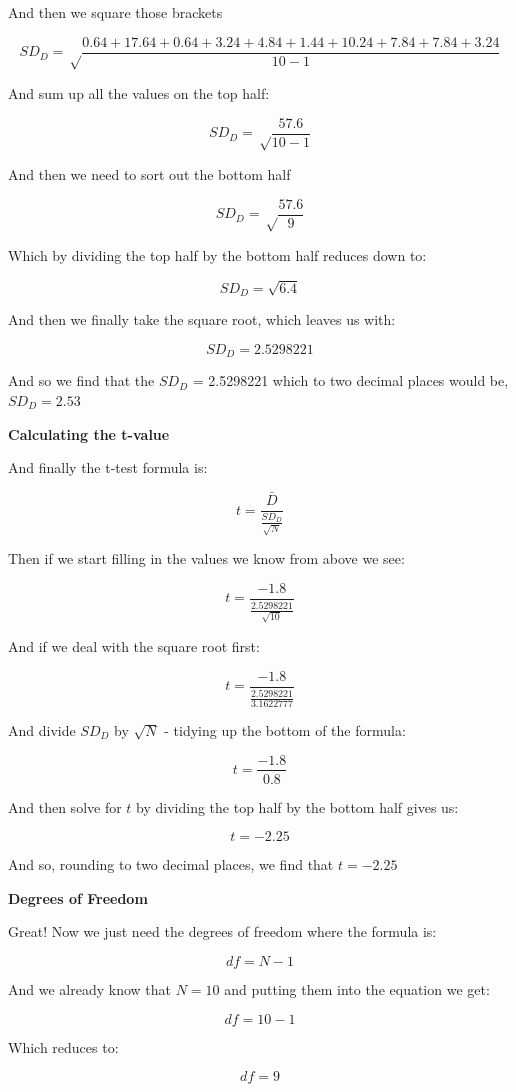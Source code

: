 \documentclass[
  oneside]{book}
\begin{document}
And then we square those brackets

\[SD_{D} =\sqrt\frac{0.64 + 17.64 + 0.64 + 3.24 + 4.84 + 1.44 + 10.24 + 7.84 + 7.84 + 3.24}{10 - 1}\]

And sum up all the values on the top half:

\[SD_{D} =\sqrt\frac{57.6}{10 - 1}\]

And then we need to sort out the bottom half

\[SD_{D} =\sqrt\frac{57.6}{9}\]

Which by dividing the top half by the bottom half reduces down to:

\[SD_{D} =\sqrt{6.4}\]

And then we finally take the square root, which leaves us with:

\[SD_{D} =2.5298221\]

And so we find that the \(SD_{D}\) = 2.5298221 which to two decimal places would be, \(SD_{D} = 2.53\)

\textbf{Calculating the t-value}

And finally the t-test formula is:

\[t = \frac{\bar{D}}{\frac{SD_{D}}{\sqrt{N}}}\]

Then if we start filling in the values we know from above we see:

\[t = \frac{-1.8}{\frac{2.5298221}{\sqrt{10}}} \]

And if we deal with the square root first:

\[t = \frac{-1.8}{\frac{2.5298221}{3.1622777}} \]

And divide \(SD_{D}\) by \(\sqrt{N}\) - tidying up the bottom of the formula:

\[t = \frac{-1.8}{0.8} \]

And then solve for \(t\) by dividing the top half by the bottom half gives us:

\[t = -2.25 \]

And so, rounding to two decimal places, we find that \(t = -2.25\)

\textbf{Degrees of Freedom}

Great! Now we just need the degrees of freedom where the formula is:

\[df = N - 1\]

And we already know that \(N= 10\) and putting them into the equation we get:

\[df = 10 - 1\]

Which reduces to:

\[df = 9\]
\end{document}
